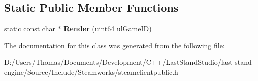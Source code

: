 \subsection*{Static Public Member Functions}
\begin{DoxyCompactItemize}
\item 
\hypertarget{classCGameID_a533b90c809f2cc984527a5c0a0cecca0}{}static const char $\ast$ {\bfseries Render} (uint64 ul\+Game\+I\+D)\label{classCGameID_a533b90c809f2cc984527a5c0a0cecca0}

\end{DoxyCompactItemize}


The documentation for this class was generated from the following file\+:\begin{DoxyCompactItemize}
\item 
D\+:/\+Users/\+Thomas/\+Documents/\+Development/\+C++/\+Last\+Stand\+Studio/last-\/stand-\/engine/\+Source/\+Include/\+Steamworks/steamclientpublic.\+h\end{DoxyCompactItemize}
